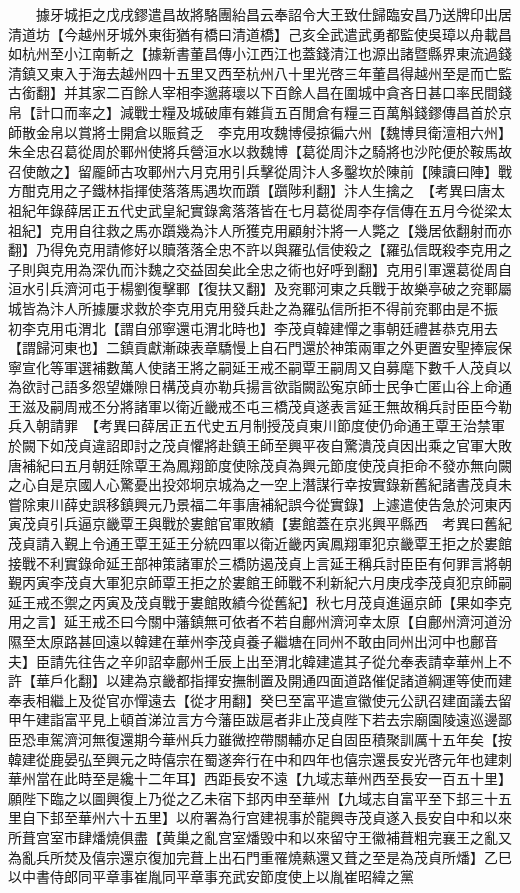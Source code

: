 　　據牙城拒之戊戌鏐遣昌故將駱團紿昌云奉詔令大王致仕歸臨安昌乃送牌印出居清道坊【今越州牙城外東街猶有橋曰清道橋】己亥全武遣武勇都監使吳璋以舟載昌如杭州至小江南斬之【據新書董昌傳小江西江也蓋錢清江也源出諸暨縣界東流過錢清鎮又東入于海去越州四十五里又西至杭州八十里光啓三年董昌得越州至是而亡監古銜翻】并其家二百餘人宰相李邈蔣瓌以下百餘人昌在圍城中貪吝日甚口率民間錢帛【計口而率之】減戰士糧及城破庫有雜貨五百閒倉有糧三百萬斛錢鏐傳昌首於京師散金帛以賞將士開倉以賑貧乏　李克用攻魏博侵掠徧六州【魏博貝衛澶相六州】朱全忠召葛從周於鄆州使將兵營洹水以救魏博【葛從周汴之騎將也沙陀便於鞍馬故召使敵之】留龎師古攻鄆州六月克用引兵擊從周汴人多鑿坎於陳前【陳讀曰陣】戰方酣克用之子鐵林指揮使落落馬遇坎而躓【躓陟利翻】汴人生擒之　【考異曰唐太祖紀年錄薛居正五代史武皇紀實錄禽落落皆在七月葛從周李存信傳在五月今從梁太祖紀】克用自往救之馬亦躓幾為汴人所獲克用顧射汴將一人斃之【幾居依翻射而亦翻】乃得免克用請修好以贖落落全忠不許以與羅弘信使殺之【羅弘信既殺李克用之子則與克用為深仇而汴魏之交益固矣此全忠之術也好呼到翻】克用引軍還葛從周自洹水引兵濟河屯于楊劉復擊鄆【復扶又翻】及兖鄆河東之兵戰于故樂亭破之兖鄆屬城皆為汴人所據屢求救於李克用克用發兵赴之為羅弘信所拒不得前兖鄆由是不振　初李克用屯渭北【謂自邠寧還屯渭北時也】李茂貞韓建憚之事朝廷禮甚恭克用去【謂歸河東也】二鎮貢獻漸疎表章驕慢上自石門還於神策兩軍之外更置安聖捧宸保寧宣化等軍選補數萬人使諸王將之嗣延王戒丕嗣覃王嗣周又自募麾下數千人茂貞以為欲討己語多怨望嫌隙日構茂貞亦勒兵揚言欲詣闕訟寃京師士民争亡匿山谷上命通王滋及嗣周戒丕分將諸軍以衛近畿戒丕屯三橋茂貞遂表言延王無故稱兵討臣臣今勒兵入朝請罪　【考異曰薛居正五代史五月制授茂貞東川節度使仍命通王覃王治禁軍於闕下如茂貞違詔即討之茂貞懼將赴鎮王師至興平夜自驚潰茂貞因出乘之官軍大敗唐補紀曰五月朝廷除覃王為鳳翔節度使除茂貞為興元節度使茂貞拒命不發亦無向闕之心自是京國人心驚憂出投郊坰京城為之一空上潛謀行幸按實錄新舊紀諸書茂貞未嘗除東川薛史誤移鎮興元乃景福二年事唐補紀誤今從實錄】上遽遣使告急於河東丙寅茂貞引兵逼京畿覃王與戰於婁館官軍敗績【婁館蓋在京兆興平縣西　考異曰舊紀茂貞請入覲上令通王覃王延王分統四軍以衛近畿丙寅鳳翔軍犯京畿覃王拒之於婁館接戰不利實錄命延王部神策諸軍於三橋防遏茂貞上言延王稱兵討臣臣有何罪言將朝覲丙寅李茂貞大軍犯京師覃王拒之於婁館王師戰不利新紀六月庚戌李茂貞犯京師嗣延王戒丕禦之丙寅及茂貞戰于婁館敗績今從舊紀】秋七月茂貞進逼京師【果如李克用之言】延王戒丕曰今關中藩鎮無可依者不若自鄜州濟河幸太原【自鄜州濟河道汾隰至太原路甚回遠以韓建在華州李茂貞養子繼塘在同州不敢由同州出河中也鄜音夫】臣請先往告之辛卯詔幸鄜州壬辰上出至渭北韓建遣其子從允奉表請幸華州上不許【華戶化翻】以建為京畿都指揮安撫制置及開通四面道路催促諸道綱運等使而建奉表相繼上及從官亦憚遠去【從才用翻】癸巳至富平遣宣徽使元公訊召建面議去留甲午建詣富平見上頓首涕泣言方今藩臣跋扈者非止茂貞陛下若去宗廟園陵遠巡邊鄙臣恐車駕濟河無復還期今華州兵力雖微控帶關輔亦足自固臣積聚訓厲十五年矣【按韓建從鹿晏弘至興元之時僖宗在蜀遂奔行在中和四年也僖宗還長安光啓元年也建刺華州當在此時至是纔十二年耳】西距長安不遠【九域志華州西至長安一百五十里】願陛下臨之以圖興復上乃從之乙未宿下邽丙申至華州【九域志自富平至下邽三十五里自下邽至華州六十五里】以府署為行宫建視事於龍興寺茂貞遂入長安自中和以來所葺宫室市肆燔燒俱盡【黄巢之亂宫室燔毁中和以來留守王徽補葺粗完襄王之亂又為亂兵所焚及僖宗還京復加完葺上出石門重罹燒爇還又葺之至是為茂貞所燔】乙巳以中書侍郎同平章事崔胤同平章事充武安節度使上以胤崔昭緯之黨